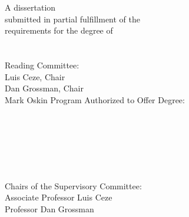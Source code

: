 \documentclass[ twoside,openright,titlepage,numbers=noenddot,headinclude,
                footinclude=true,cleardoublepage=empty,abstractoff,%
                BCOR=5mm,paper=letter,fontsize=11pt,letterpaper,%
                american,%
                ]{scrreprt}
\begin{document}
\raggedbottom
\pagestyle{plain}


\begin{titlepage}
	\begin{addmargin}[-1cm]{-3cm}
    \begin{center}
        \large
        \hfill
        \vfill
        \begingroup
            \color{Violet} \\
            \color{Violet} \\ \bigskip
        \endgroup
        \vfill
        A dissertation \\
        submitted in partial fulfillment of the \\
        requirements for the degree of \\
        \medskip
         \\
        \bigskip
         \\
        \smallskip
        \vfill
        Reading Committee: \\
        \smallskip
        Luis Ceze, Chair \\
        \smallskip
        Dan Grossman, Chair \\
        \smallskip
        Mark Oskin
        \vfill
        Program Authorized to Offer Degree: \\
        \smallskip
    \end{center}
  \end{addmargin}
\end{titlepage}


\cleardoublepage
\thispagestyle{empty}
\begin{center}
    \vspace*{20ex}
    \textcopyright\  \\
    \bigskip
\end{center}


\cleardoublepage
\thispagestyle{empty}

\begin{center}
     \\
    \bigskip
     \\
     \\
    \bigskip
     \\
    \bigskip
    Chairs of the Supervisory Committee: \\
    Associate Professor Luis Ceze \\
    Professor Dan Grossman \\
     \\
    \bigskip
\end{center}
\end{document}
